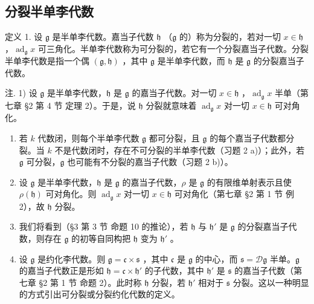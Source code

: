 \subsection{分裂半单李代数}

定义 1. 设 \(\mathfrak{g}\) 是半单李代数。嘉当子代数 \(\mathfrak{h}\) （\(\mathfrak{g}\) 的）称为分裂的，若对一切 \(x \in \mathfrak{h}\) ，\(\operatorname{ad}_{\mathfrak{g}} x\) 可三角化。半单李代数称为可分裂的，若它有一个分裂嘉当子代数。分裂半单李代数是指一个偶 \((\mathfrak{g}, \mathfrak{h})\) ，其中 \(\mathfrak{g}\) 是半单李代数，而 \(\mathfrak{h}\) 是 \(\mathfrak{g}\) 的分裂嘉当子代数。

注. 1) 设 \(\mathfrak{g}\) 是半单李代数，\(\mathfrak{h}\) 是 \(\mathfrak{g}\) 的嘉当子代数。对一切 \(x \in \mathfrak{h}\) ，\(\operatorname{ad}_{\mathfrak{g}} x\) 半单（第七章 §2 第 4 节 定理 2）。于是，说 \(\mathfrak{h}\) 分裂就意味着 \(\operatorname{ad}_{\mathfrak{g}} x\) 对一切 \(x \in \mathfrak{h}\) 可对角化。

\begin{enumerate}
\def\labelenumi{\arabic{enumi})}
\setcounter{enumi}{1}
\item
  若 \(k\) 代数闭，则每个半单李代数 \(\mathfrak{g}\) 都可分裂，且 \(\mathfrak{g}\) 的每个嘉当子代数都分裂。当 \(k\) 不是代数闭时，存在不可分裂的半单李代数（习题 2 a)）；此外，若 \(\mathfrak{g}\) 可分裂，\(\mathfrak{g}\) 也可能有不分裂的嘉当子代数（习题 2 b)）。
\item
  设 \(\mathfrak{g}\) 是半单李代数，\(\mathfrak{h}\) 是 \(\mathfrak{g}\) 的嘉当子代数，\(\rho\) 是 \(\mathfrak{g}\) 的有限维单射表示且使 \(\rho(\mathfrak{h})\) 可对角化。则 \(\operatorname{ad}_{\mathfrak{g}}x\) 对一切 \(x \in \mathfrak{h}\) 可对角化（第七章 §2 第 1 节 例 2），故 \(\mathfrak{h}\) 分裂。
\item
  我们将看到（§3 第 3 节 命题 10 的推论），若 \(\mathfrak{h}\) 与 \(\mathfrak{h}'\) 是 \(\mathfrak{g}\) 的分裂嘉当子代数，则存在 \(\mathfrak{g}\) 的初等自同构把 \(\mathfrak{h}\) 变为 \(\mathfrak{h}'\) 。
\item
  设 \(\mathfrak{g}\) 是约化李代数。则 \(\mathfrak{g} = \mathfrak{c} \times \mathfrak{s}\) ，其中 \(\mathfrak{c}\) 是 \(\mathfrak{g}\) 的中心，而 \(\mathfrak{s} = \mathcal{D}\mathfrak{g}\) 半单。\(\mathfrak{g}\) 的嘉当子代数正是形如 \(\mathfrak{h} = \mathfrak{c} \times \mathfrak{h}'\) 的子代数，其中 \(\mathfrak{h}'\) 是 \(\mathfrak{s}\) 的嘉当子代数（第七章 §2 第 1 节 命题 2）。此时称 \(\mathfrak{h}\) 分裂，若 \(\mathfrak{h}'\) 相对于 \(\mathfrak{s}\) 分裂。这以一种明显的方式引出可分裂或分裂约化代数的定义。
\end{enumerate}
\relax{}

